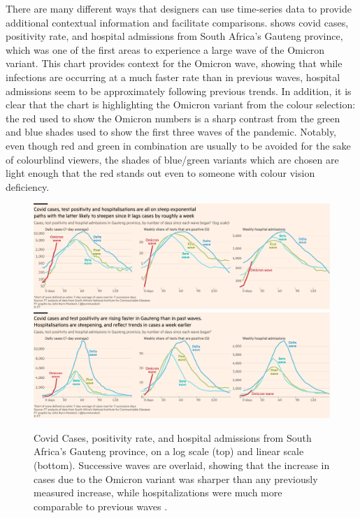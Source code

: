 \documentclass[article]{jdssv}\usepackage[]{graphicx}\usepackage[]{xcolor}
\begin{document}
There are many different ways that designers can use time-series data to provide additional contextual information and facilitate comparisons.  shows covid cases, positivity rate, and hospital admissions from South Africa's Gauteng province, which was one of the first areas to experience a large wave of the Omicron variant. This chart provides context for the Omicron wave, showing that while infections are occurring at a much faster rate than in previous waves, hospital admissions seem to be approximately following previous trends. In addition, it is clear that the chart is highlighting the Omicron variant from the colour selection: the red used to show the Omicron numbers is a sharp contrast from the green and blue shades used to show the first three waves of the pandemic. Notably, even though red and green in combination are usually to be avoided for the sake of colourblind viewers, the shades of blue/green variants which are chosen are light enough that the red stands out even to someone with colour vision deficiency.

\begin{figure}\centering
\includegraphics[width=\linewidth]{ft-waves}\\
\includegraphics[width=\linewidth]{ft-waves-linear}
\caption{Covid Cases, positivity rate, and hospital admissions from South Africa's Gauteng province, on a log scale (top) and linear scale (bottom). Successive waves are overlaid, showing that the increase in cases due to the Omicron variant was sharper than any previously measured increase, while hospitalizations were much more comparable to previous waves \citep{burn-murdoch_new_2021-1}.}
\label{fig:ft-waves}
\end{figure}
\end{document}

